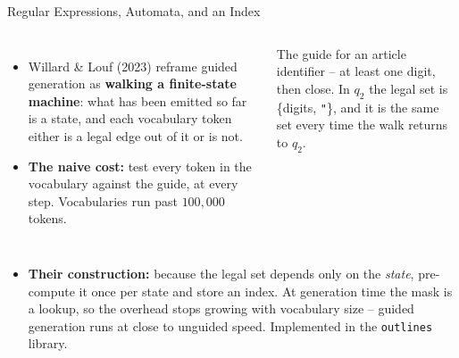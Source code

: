 \begin{frame}{Regular Expressions, Automata, and an Index}
\begin{columns}[T]
\small
\begin{itemize}
  \item Willard \& Louf (2023) reframe guided generation as \textbf{walking a finite-state machine}: what has been emitted so far is a state, and each vocabulary token either is a legal edge out of it or is not.
  \pause
  \item \textbf{The naive cost:} test every token in the vocabulary against the guide, at every step. Vocabularies run past $100{,}000$ tokens.
\end{itemize}
\centering
{}

\vspace{0.4em}
\scriptsize The guide for an article identifier -- at least one digit, then close. In $q_2$ the legal set is \{digits, \texttt{"}\}, and it is the same set every time the walk returns to $q_2$.
\end{columns}
\pause
\vspace{0.3em}
\begin{itemize}
  \small
  \item \textbf{Their construction:} because the legal set depends only on the \emph{state}, pre-compute it once per state and store an index. At generation time the mask is a lookup, so the overhead stops growing with vocabulary size -- guided generation runs at close to unguided speed. Implemented in the \texttt{outlines} library.
\end{itemize}
\end{frame}

